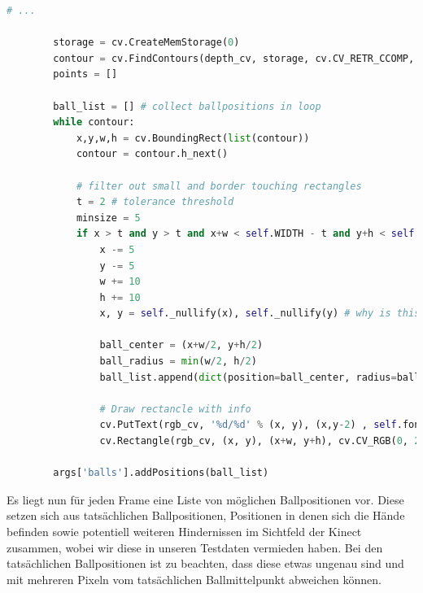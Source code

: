 \documentclass[12pt,a4paper,ngerman]{scrartcl}
\begin{document}
\vspace{0.5cm}
\begin{lstlisting}[language=Python,caption={RectsFilter.py, Ausschnitt}]
# ...

        storage = cv.CreateMemStorage(0)
        contour = cv.FindContours(depth_cv, storage, cv.CV_RETR_CCOMP, cv.CV_CHAIN_APPROX_SIMPLE)
        points = []

        ball_list = [] # collect ballpositions in loop
        while contour:
            x,y,w,h = cv.BoundingRect(list(contour))
            contour = contour.h_next()

            # filter out small and border touching rectangles
            t = 2 # tolerance threshold
            minsize = 5
            if x > t and y > t and x+w < self.WIDTH - t and y+h < self.HEIGHT - t and w > minsize and h > minsize:
                x -= 5
                y -= 5
                w += 10
                h += 10
                x, y = self._nullify(x), self._nullify(y) # why is this necessary now?

                ball_center = (x+w/2, y+h/2)
                ball_radius = min(w/2, h/2)
                ball_list.append(dict(position=ball_center, radius=ball_radius))

                # Draw rectancle with info
                cv.PutText(rgb_cv, '%d/%d' % (x, y), (x,y-2) , self.font, (0, 255, 0))
                cv.Rectangle(rgb_cv, (x, y), (x+w, y+h), cv.CV_RGB(0, 255,0), 2)

        args['balls'].addPositions(ball_list)
\end{lstlisting}

Es liegt nun
für jeden Frame eine Liste von möglichen Ballpositionen vor. Diese setzen sich aus tatsächlichen Ballpositionen, Positionen in denen sich die Hände befinden sowie potentiell weiteren Hindernissen im Sichtfeld der Kinect zusammen, wobei wir diese in unseren Testdaten vermieden haben. Bei den tatsächlichen Ballpositionen ist zu beachten, dass diese etwas ungenau sind und mit mehreren Pixeln vom tatsächlichen Ballmittelpunkt abweichen können.
\end{document}
